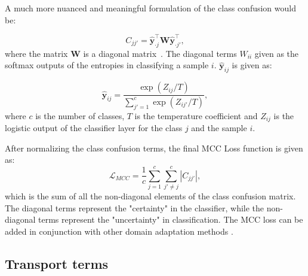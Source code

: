 \documentclass[10pt,twocolumn,letterpaper]{article}
\begin{document}
A much more nuanced and meaningful formulation of the class confusion would be:

 \begin{equation}
     C_{jj'} = \hat{\mathbf{y}}_{\cdot j}^{\intercal} \mathbf{W} \hat{\mathbf{y}}_{\cdot j'}^{\intercal},
 \end{equation}
where the matrix $\mathbf{W}$ is a diagonal matrix~\cite{mcc}. The diagonal terms $W_{ii}$ given as the softmax outputs of the entropies in classifying a sample $i$. $\hat{\mathbf{y}}_{ij}$ is given as: 
  
 \begin{equation}
  \hat{\mathbf{y}}_{ij} = \frac{ \exp(Z_{ij} / T ) }{\sum_{j'=1} ^ {c} \exp (Z_{ij'}/ T )} ,   
 \end{equation}
where $c$ is the number of classes, $T$ is the temperature coefficient and $Z_{ij}$ is the logistic output of the classifier layer for the class $j$ and the sample $i$. 

After normalizing the class confusion terms, the final MCC Loss function is given as:
 \begin{equation}
     \mathcal{L}_{MCC} = \frac{1}{c} \sum_{j=1}^ {c} \sum_{j' \neq j}^ {c}|C_{jj'}|,
 \end{equation}
which is the sum of all the non-diagonal elements of the class confusion matrix. The diagonal terms represent the "certainty" in the classifier, while the non-diagonal terms represent the "uncertainty" in classification. The MCC loss can be added in conjunction with other domain adaptation methods \cite{mcc}.


 
\subsection{Transport terms}
\end{document}
